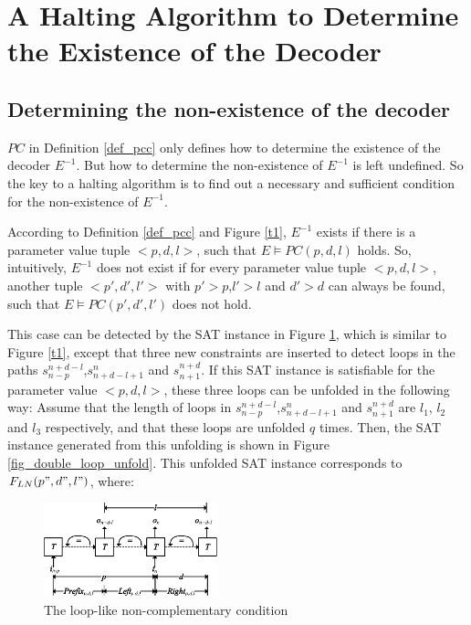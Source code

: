 \documentclass[journal]{IEEEtran}
\begin{document}
\section{A Halting Algorithm to Determine the Existence of the Decoder}\label{sec_exist}
\subsection{Determining the non-existence of the decoder}\label{subsec_deterNo}

$PC$ in Definition \ref{def_pcc} only defines how to determine the existence of the decoder $E^{-1}$.
But how to determine the non-existence of $E^{-1}$ is left undefined.
So the key to a halting algorithm is to find out a necessary and sufficient condition for the non-existence of $E^{-1}$.

According to Definition \ref{def_pcc} and Figure \ref{t1},
$E^{-1}$ exists if there is a parameter value tuple $<p,d,l>$,
such that $E\vDash PC(p,d,l)$ holds.
So,
intuitively,
$E^{-1}$ does not exist if for every parameter value tuple $<p,d,l>$,
another tuple $<p',d',l'>$ with $p'>p$,$l'>l$ and $d'>d$ can always be found,
such that $E\vDash PC(p',d',l')$ does not hold.

This case can be detected by the SAT instance in Figure \ref{fig_double_loop},
which is similar to Figure \ref{t1},
except that three new constraints are inserted to detect loops in the paths $s_{n-p}^{n+d-l}$,$s_{n+d-l+1}^n$ and $s_{n+1}^{n+d}$.
If this SAT instance is satisfiable for the parameter value $<p,d,l>$,
these three loops can be unfolded in the following way:
Assume that the length of loops in $s_{n-p}^{n+d-l}$,$s_{n+d-l+1}^n$ and $s_{n+1}^{n+d}$ are $l_1$, $l_2$ and $l_3$ respectively,
and that these loops are unfolded $q$ times.
Then,
the SAT instance generated from this unfolding is shown in Figure \ref{fig_double_loop_unfold}.
This unfolded SAT instance corresponds to $F_{LN}(p",d",l")$,
where:

\begin{figure}[t]
\begin{center}
\includegraphics[width=0.45\textwidth]{doubleloop}
\end{center}
\caption{The loop-like non-complementary condition}
  \label{fig_double_loop}
\end{figure}
\end{document}
